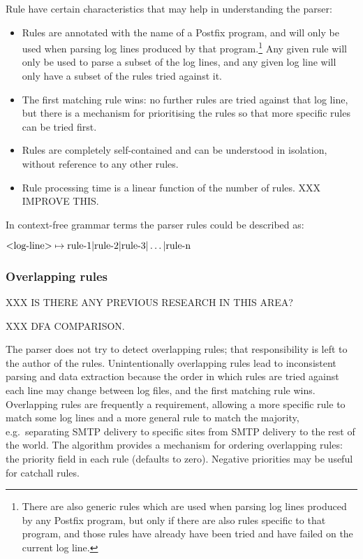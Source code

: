 \label{rule characteristics}

Rule have certain characteristics that may help in understanding the
parser:

\begin{itemize}

    \item Rules are annotated with the name of a Postfix program, and will
        only be used when parsing log lines produced by that
        program.\footnote{There are also generic rules which are used when
        parsing log lines produced by any Postfix program, but only if
        there are also rules specific to that program, and those rules have
        already have been tried and have failed on the current log line.}
        Any given rule will only be used to parse a subset of the log
        lines, and any given log line will only have a subset of the rules
        tried against it.

    \item The first matching rule wins: no further rules are tried against
        that log line, but there is a mechanism for prioritising the rules
        so that more specific rules can be tried first.

    \item Rules are completely self-contained and can be understood in
        isolation, without reference to any other rules.

    \item Rule processing time is a linear function of the number of rules.
        XXX IMPROVE THIS\@.

\end{itemize}

\label{comparison against context-free grammars}

In context-free grammar terms the parser rules could be described as:

$\text{\textless{}log-line\textgreater{}} \mapsto \text{rule-1} |
\text{rule-2} | \text{rule-3} | \dots | \text{rule-n}$


\subsubsection{Overlapping rules}

\label{overlapping rules}

XXX IS THERE ANY PREVIOUS RESEARCH IN THIS AREA\@?

XXX DFA COMPARISON\@.

The parser does not try to detect overlapping rules; that responsibility is
left to the author of the rules.  Unintentionally overlapping rules lead to
inconsistent parsing and data extraction because the order in which rules
are tried against each line may change between log files, and the first
matching rule wins.  Overlapping rules are frequently a requirement,
allowing a more specific rule to match some log lines and a more general
rule to match the majority, e.g.\ separating \gls{SMTP} delivery to
specific sites from \gls{SMTP} delivery to the rest of the world.  The
algorithm provides a mechanism for ordering overlapping rules: the priority
field in each rule (defaults to zero).  Negative priorities may be useful
for catchall rules.

